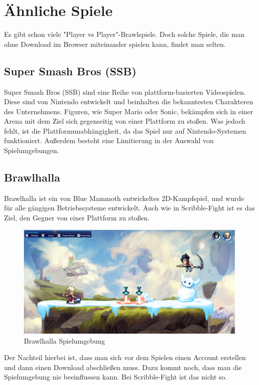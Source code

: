 \section{Ähnliche Spiele}
Es gibt schon viele "Player vs Player"-Brawlspiele. Doch solche Spiele, die man ohne Download im Browser
miteinander spielen kann, findet man selten.

\subsection{Super Smash Bros (SSB)}
Super Smash Bros (SSB) sind eine Reihe von plattform-basierten Videospielen.
Diese sind von Nintendo entwickelt und beinhalten die bekanntesten Charakteren des Unternehmens.
Figuren, wie Super Mario oder Sonic, bekämpfen sich in einer Arena mit dem Ziel sich gegenseitig
von einer Plattform zu stoßen.
Was jedoch fehlt, ist die Plattformunabhängigkeit, da das Spiel nur auf Nintendo-Systemen funktioniert.
Außerdem besteht eine Limitierung in der Auswahl von Spielumgebungen.

\subsection{Brawlhalla}
Brawlhalla ist ein von Blue Mammoth entwickeltes 2D-Kampfspiel, und wurde für alle gängigen Betriebssysteme entwickelt.
Auch wie in Scribble-Fight ist es das Ziel, den Gegner von einer Plattform zu stoßen.

\begin{figure}[H]
    \centering
    \includegraphics[scale=0.3]{pics/brawlhalla.PNG}
    \caption{Brawlhalla Spielumgebung}
    \label{fig:impl:knuth}
\end{figure}

Der Nachteil hierbei ist, dass man sich vor dem Spielen einen Account erstellen
und dann einen Download abschließen muss. Dazu kommt noch, dass man die Spielumgebung nie beeinflussen kann.
Bei Scribble-Fight ist das nicht so.

